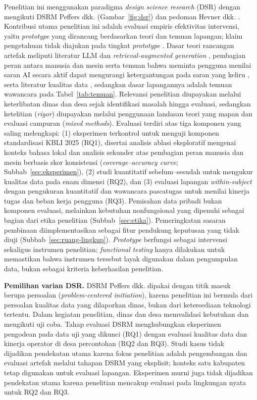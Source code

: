 Penelitian ini menggunakan paradigma \textit{design science research} (DSR) dengan mengikuti DSRM Peffers dkk. \cite{peffers2007dsrm} (Gambar~\ref{fig:dsr}) dan pedoman Hevner dkk. \cite{hevner2004design}. Kontribusi utama penelitian ini adalah evaluasi empiris efektivitas intervensi, yaitu \textit{prototype} yang dirancang berdasarkan teori dan temuan lapangan; klaim pengetahuan tidak diajukan pada tingkat \textit{prototype} \cite{gregor2013positioning}. Dasar teori rancangan artefak meliputi literatur LLM dan \textit{retrieval-augmented generation} \cite{gao2023ragsurvey,ji2023hallucination}, pembagian peran antara manusia dan mesin \cite{raisch2021automation} serta temuan bahwa meminta pengguna menilai saran AI secara aktif dapat mengurangi ketergantungan pada saran yang keliru \cite{bucinca2021trust}, serta literatur kualitas data \cite{iso25012,govuk2021dqdimensions}, sedangkan dasar lapangannya adalah temuan wawancara pada Tabel~\ref{tab:temuan}. Relevansi penelitian diupayakan melalui keterlibatan dinas dan desa sejak identifikasi masalah hingga evaluasi, sedangkan ketelitian (\textit{rigor}) diupayakan melalui penggunaan landasan teori yang mapan dan evaluasi campuran (\textit{mixed methods}). Evaluasi terdiri atas tiga komponen yang saling melengkapi: (1) eksperimen terkontrol untuk menguji komponen standardisasi KBLI 2025 (RQ1), disertai analisis ablasi eksploratif mengenai konteks bahasa lokal dan analisis sekunder atas pembagian peran manusia dan mesin berbasis skor konsistensi (\textit{coverage--accuracy curve}; Subbab~\ref{sec:eksperimen}), (2) studi kuantitatif sebelum--sesudah untuk mengukur kualitas data pada enam dimensi (RQ2), dan (3) evaluasi lapangan \textit{within-subject} dengan pengukuran kuantitatif dan wawancara pascatugas untuk menilai kinerja tugas dan beban kerja pengguna (RQ3). Pemisahan data pribadi bukan komponen evaluasi, melainkan kebutuhan nonfungsional yang dipenuhi sebagai bagian dari etika penelitian (Subbab~\ref{sec:etika}). Pemeringkatan sasaran pembinaan diimplementasikan sebagai fitur pendukung keputusan yang tidak diuji (Subbab~\ref{sec:ruang-lingkup}). \textit{Prototype} berfungsi sebagai intervensi sekaligus instrumen penelitian; \textit{functional testing} hanya dilakukan untuk memastikan bahwa instrumen tersebut layak digunakan dalam pengumpulan data, bukan sebagai kriteria keberhasilan penelitian.

\textbf{Pemilihan varian DSR.} DSRM Peffers dkk. \cite{peffers2007dsrm} dipakai dengan titik masuk berupa persoalan (\textit{problem-centered initiation}), karena penelitian ini bermula dari persoalan kualitas data yang dilaporkan dinas, bukan dari ketersediaan teknologi tertentu. Dalam kegiatan penelitian, dinas dan desa memvalidasi kebutuhan dan mengikuti uji coba. Tahap evaluasi DSRM menghubungkan eksperimen pengodean pada data uji yang dikunci (RQ1) dengan evaluasi kualitas data dan kinerja operator di desa percontohan (RQ2 dan RQ3). Studi kasus tidak dijadikan pendekatan utama karena fokus penelitian adalah pengembangan dan evaluasi artefak melalui tahapan DSRM yang eksplisit; konteks satu kabupaten tetap digunakan untuk evaluasi lapangan. Eksperimen murni juga tidak dijadikan pendekatan utama karena penelitian mencakup evaluasi pada lingkungan nyata untuk RQ2 dan RQ3.

